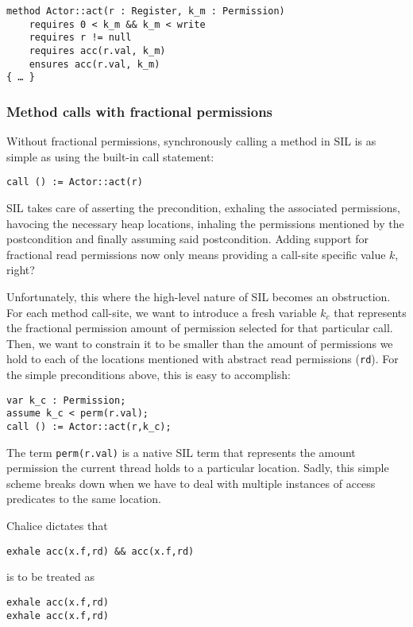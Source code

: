 \begin{lstlisting}[float,caption={Handling of fractional read permissions by the Chalice2SIL translator},label=lst:fraccallees,language=SIL]
method Actor::act(r : Register, k_m : Permission)
	requires 0 < k_m && k_m < write
	requires r != null
	requires acc(r.val, k_m)
	ensures acc(r.val, k_m)
{ … }
\end{lstlisting}

\subsubsection{Method calls with fractional permissions}\label{sct:methcall}
Without fractional permissions, synchronously calling a method in SIL is as simple as using the built-in call statement:

\begin{lstlisting}[language=SIL]
call () := Actor::act(r)
\end{lstlisting}

SIL takes care of asserting the precondition, exhaling the associated permissions, havocing the necessary heap locations, inhaling the permissions mentioned by the postcondition and finally assuming said postcondition. Adding support for fractional read permissions now only means providing a call-site specific value $k$, right? 

Unfortunately, this where the high-level nature of SIL becomes an obstruction. 
For each method call-site, we want to introduce a fresh variable $k_c$ that represents the fractional permission amount of permission selected for that particular call. 
Then, we want to constrain it to be smaller than the amount of permissions we hold to each of the locations mentioned with abstract read permissions (\lstinline!rd!). For the simple preconditions above, this is easy to accomplish:

\begin{lstlisting}[language=SIL]
var k_c : Permission;
assume k_c < perm(r.val);
call () := Actor::act(r,k_c);
\end{lstlisting}

The term \lstinline!perm(r.val)! is a native SIL term that represents the amount permission the current thread holds to a particular location. 
Sadly, this simple scheme breaks down when we have to deal with multiple instances of access predicates to the same location.

Chalice dictates that
\begin{lstlisting}[language=SIL]
exhale acc(x.f,rd) && acc(x.f,rd)
\end{lstlisting}
is to be treated as
\begin{lstlisting}[language=SIL]
exhale acc(x.f,rd)
exhale acc(x.f,rd)
\end{lstlisting}

